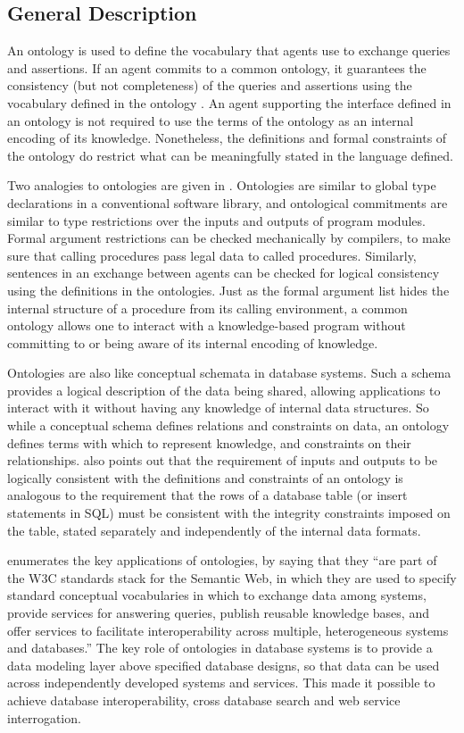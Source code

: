 \subsection{General Description}
An ontology is used to define the vocabulary that agents use to exchange
queries and assertions. If an agent commits to a common ontology, it
guarantees the consistency (but not completeness) of the queries and
assertions using the vocabulary defined in the ontology \cite{gruber93towards}.
An agent supporting the interface defined in an ontology is not
required to use the terms of the ontology as an internal encoding of
its knowledge. Nonetheless, the definitions and formal constraints of
the ontology do restrict what can be meaningfully stated in the
language defined. 

Two analogies to ontologies are given in \cite{gruber93towards}. Ontologies are
similar to global type declarations in a conventional software library,
and ontological commitments are similar to type restrictions over the
inputs and outputs of program modules. Formal argument restrictions can
be checked mechanically by compilers, to make sure that calling
procedures pass legal data to called procedures. Similarly, sentences
in an exchange between agents can be checked for logical consistency
using the definitions in the ontologies. Just as the formal argument
list hides the internal structure of a procedure from its calling
environment, a common ontology allows one to interact with a
knowledge-based program without committing to or being aware of its
internal encoding of knowledge. 

Ontologies are also like conceptual schemata in database systems. Such a
schema provides a logical description of the data being shared,
allowing applications to interact with it without having any knowledge
of internal data structures. So while a conceptual schema defines
relations and constraints on data, an ontology defines terms with which
to represent knowledge, and constraints on their relationships.
\cite{gruber2008ontology} also points out that the requirement of inputs and
outputs to be logically consistent with the definitions and constraints
of an ontology is analogous to the requirement that the rows of a
database table (or insert statements in SQL) must be consistent with
the integrity constraints imposed on the table, stated separately and
independently of the internal data formats. 

\cite{gruber2008ontology} enumerates the key applications of ontologies, by saying
that they {\textquotedblleft}are part of the W3C standards stack for
the Semantic Web, in which they are used to specify standard conceptual
vocabularies in which to exchange data among systems, provide services
for answering queries, publish reusable knowledge bases, and offer
services to facilitate interoperability across multiple, heterogeneous
systems and databases.{\textquotedblright} The key role of ontologies
in database systems is to provide a data modeling layer above specified
database designs, so that data can be used across independently
developed systems and services. This made it possible to achieve
database interoperability, cross database search and web service
interrogation. 

